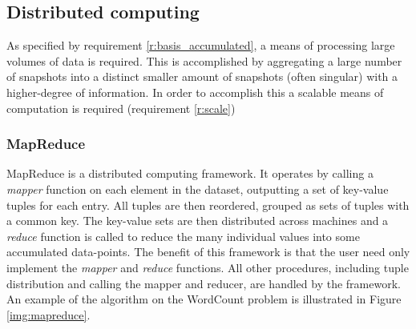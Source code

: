 
\subsection{Distributed computing}
As specified by requirement \ref{r:basis_accumulated}, a means of processing large volumes of data is required. This is accomplished by aggregating a large number of snapshots into a distinct smaller amount of snapshots (often singular) with a higher-degree of information. In order to accomplish this a scalable means of computation is required (requirement \ref{r:scale}) 
\subsubsection{MapReduce}
MapReduce \cite{mapreduce} is a distributed computing framework. It operates by calling a \emph{mapper} function on each element in the dataset, outputting a set of key-value tuples for each entry. All tuples are then reordered, grouped as sets of tuples with a common key. The key-value sets are then distributed across machines and a \emph{reduce} function is called to reduce the many individual values into some accumulated data-points. The benefit of this framework is that the user need only implement the \emph{mapper} and \emph{reduce} functions. All other procedures, including tuple distribution and calling the mapper and reducer, are handled by the framework. An example of the algorithm on the WordCount problem is illustrated in Figure \ref{img:mapreduce}.

